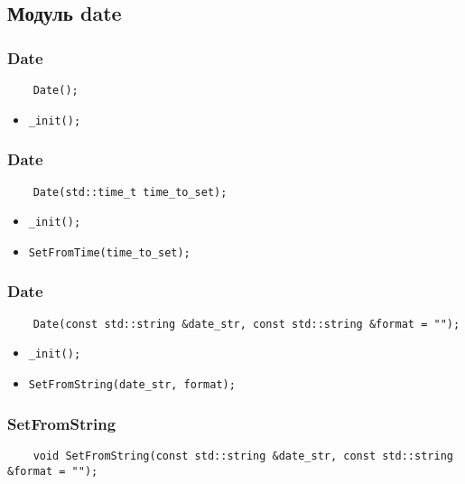 \subsection{Модуль date}

\subsubsection{Date}

\begin{lstlisting}
    Date();
\end{lstlisting}

\begin{itemize}
    \item \verb|_init();|
\end{itemize}

\subsubsection{Date}

\begin{lstlisting}
    Date(std::time_t time_to_set);
\end{lstlisting}

\begin{itemize}
    \item \verb|_init();|
    \item \verb|SetFromTime(time_to_set);|
\end{itemize}

\subsubsection{Date}

\begin{lstlisting}
    Date(const std::string &date_str, const std::string &format = "");
\end{lstlisting}

\begin{itemize}
    \item \verb|_init();|
    \item \verb|SetFromString(date_str, format);|
\end{itemize}

\subsubsection{SetFromString}

\begin{lstlisting}
    void SetFromString(const std::string &date_str, const std::string &format = "");
\end{lstlisting}

